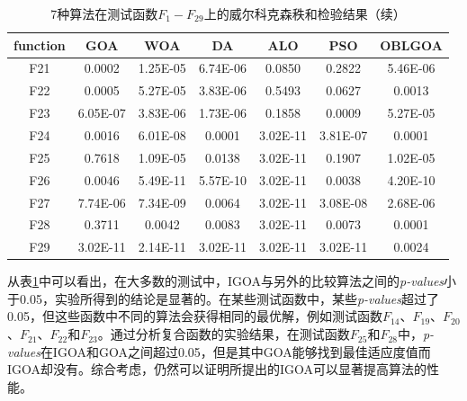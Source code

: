 \begin{table}[ht]
    \ContinuedFloat%
    \centering
    \caption{7种算法在测试函数$F_1-F_{29}$上的威尔科克森秩和检验结果（续）}\label{tab:results_wilcoxon_rank_sum_test_IGOA}
    \renewcommand\arraystretch{1.3} 
    \begin{tabular}{*{7}{c}}
        \hline
        function&GOA&WOA&DA&ALO&PSO&OBLGOA\\
        \hline
    {F21}& 0.0002&1.25E-05&6.74E-06&0.0850&0.2822&5.46E-06\\\hline
    {F22}& 0.0005&5.27E-05&3.83E-06&0.5493&0.0627&0.0013\\\hline
    {F23}& 6.05E-07&3.83E-06&1.73E-06&0.1858&0.0009&5.27E-05\\\hline
    {F24}& 0.0016&6.01E-08&0.0001&3.02E-11&3.81E-07&0.0001\\\hline
    {F25}& 0.7618&1.09E-05&0.0138&3.02E-11&0.1907&1.02E-05\\\hline
    {F26}& 0.0046&5.49E-11&5.57E-10&3.02E-11&0.0038&4.20E-10\\\hline
    {F27}& 7.74E-06&7.34E-09&0.0064&3.02E-11&3.08E-08&2.68E-06\\\hline
    {F28}& 0.3711&0.0042&0.0083&3.02E-11&0.0073&0.0001\\\hline
    {F29}& 3.02E-11&2.14E-11&3.02E-11&3.02E-11&3.02E-11&0.0024\\\hline
    
\end{tabular}
\end{table}

从表\ref{tab:results_wilcoxon_rank_sum_test_IGOA}中可以看出，在大多数的测试中，IGOA与另外的比较算法之间的\emph {p-values}小于0.05，实验所得到的结论是显著的。在某些测试函数中，某些\emph{p-values}超过了0.05，但这些函数中不同的算法会获得相同的最优解，例如测试函数$F_{14}$、$F_{19}$、$F_{20}$、$F_{21}$、$F_{22}$和$F_{23}$。通过分析复合函数的实验结果，在测试函数$F_{25}$和$F_{28}$中，\emph{p-values}在IGOA和GOA之间超过0.05，但是其中GOA能够找到最佳适应度值而IGOA却没有。综合考虑，仍然可以证明所提出的IGOA可以显著提高算法的性能。
